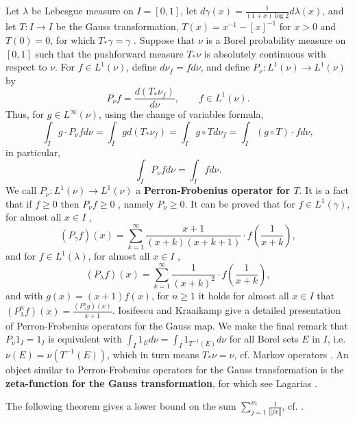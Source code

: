 \documentclass{article}
\newcommand{\norm}[1]{\left\Vert #1 \right\Vert}
\begin{document}
Let $\lambda$ be Lebesgue measure on $I=[0,1]$, let
$d\gamma(x) = \frac{1}{(1+x)\log 2} d\lambda(x)$, and let $T:I \to I$ be the Gauss transformation,
$T(x)=x^{-1}-[x]^{-1}$ for $x >0$ and $T(0)=0$, for which $T_*\gamma = \gamma$   \cite[p.~77, Lemma 3.5]{einsiedler}. 
Suppose that $\nu$ is a Borel probability measure on $[0,1]$ such that the pushforward measure $T_* \nu$ is absolutely continuous with respect
to $\nu$. For $f \in L^1(\nu)$,
define $d\nu_f = f d\nu$, and define
$P_\nu:L^1(\nu) \to L^1(\nu)$ by
\[
P_\nu f = \frac{d(T_* \nu_f)}{d\nu},\qquad f \in L^1(\nu).
\]
Thus, for $g \in L^\infty(\nu)$, using the change of variables formula,
\[
\int_I g \cdot P_\nu f d\nu = \int_I g d(T_* \nu_f) = 
\int_I g \circ T d\nu_f
=\int_I (g \circ T) \cdot f d\nu,
\]
in particular,
\[
\int_I P_\nu f d\nu = \int_I f d\nu.
\]
We call $P_\nu:L^1(\nu) \to L^1(\nu)$ a \textbf{Perron-Frobenius operator for $T$}. It is a fact that
if $f \geq 0$ then $P_\nu f \geq 0$ \cite[p.~57, Proposition 2.1.1]{iosifescu}, namely $P_\nu \geq 0$.
It can be proved  that for $f \in L^1(\gamma)$, for almost all $x \in I$ \cite[p.~59, Proposition 2.1.2]{iosifescu},
\[
(P_\gamma f)(x) = \sum_{k=1}^\infty \frac{x+1}{(x+k)(x+k+1)}\cdot f\left(\frac{1}{x+k}\right),
\]
and for $f \in L^1(\lambda)$, for almost all $x \in I$ \cite[p.~60, Corollary 2.1.4]{iosifescu},
\[
(P_\lambda f)(x) = \sum_{k=1}^\infty \frac{1}{(x+k)^2} \cdot f\left(\frac{1}{x+k}\right),
\]
and with $g(x)=(x+1)f(x)$, for $n \geq 1$ it holds for almost all $x \in I$ that
 $(P_\lambda^n f)(x) = \frac{(P_\gamma^n g)(x)}{x+1}$.
 Iosifescu and Kraaikamp \cite[Chapter 2]{iosifescu} give a detailed presentation of Perron-Frobenius operators for the Gauss
 map. We make the final remark that
 $P_\nu 1_I = 1_I$ is equivalent with
 $\int_I 1_E  d\nu = \int_I 1_{T^{-1}(E)} d\nu$ for all Borel sets $E$ in $I$, 
 i.e. $\nu(E) = \nu(T^{-1}(E))$, which in turn means $T_* \nu = \nu$, cf. Markov operators \cite[Chapter 5, \S 5.1, pp. 177-186]{Krengel}.
An object similar to Perron-Frobenius operators for the Gauss transformation
is the \textbf{zeta-function for the Gauss transformation}, for which see Lagarias \cite[p.~58, \S 3.3]{zetafunctions}.
 
 



The following theorem gives a lower bound on the sum $\sum_{j=1}^m \frac{1}{\norm{jx}}$, cf. \cite[p.~4, Theorem 3.1]{2007arXiv0709.2882V}.
\end{document}
